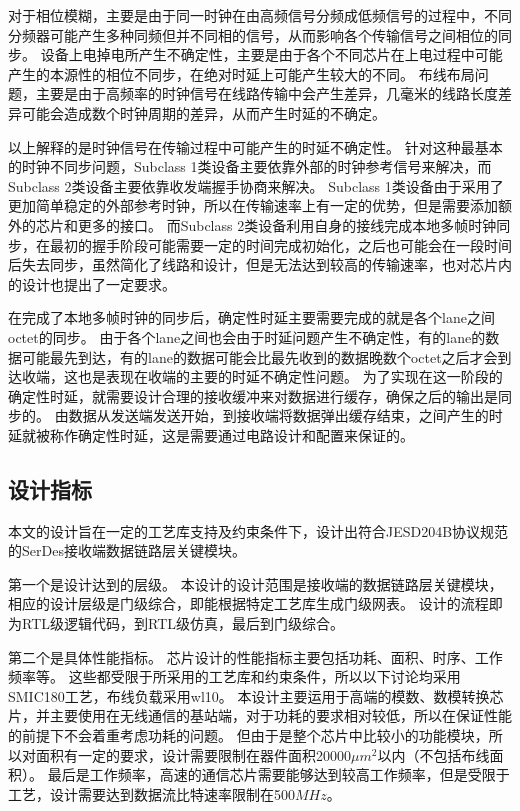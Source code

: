 \documentclass[UTF8]{ctexart}
\begin{document}
对于相位模糊，主要是由于同一时钟在由高频信号分频成低频信号的过程中，不同分频器可能产生多种同频但并不同相的信号，从而影响各个传输信号之间相位的同步。
设备上电掉电所产生不确定性，主要是由于各个不同芯片在上电过程中可能产生的本源性的相位不同步，在绝对时延上可能产生较大的不同。
布线布局问题，主要是由于高频率的时钟信号在线路传输中会产生差异，几毫米的线路长度差异可能会造成数个时钟周期的差异，从而产生时延的不确定。

以上解释的是时钟信号在传输过程中可能产生的时延不确定性。
针对这种最基本的时钟不同步问题，Subclass 1类设备主要依靠外部的时钟参考信号来解决，而Subclass 2类设备主要依靠收发端握手协商来解决。
Subclass 1类设备由于采用了更加简单稳定的外部参考时钟，所以在传输速率上有一定的优势，但是需要添加额外的芯片和更多的接口。
而Subclass 2类设备利用自身的接线完成本地多帧时钟同步，在最初的握手阶段可能需要一定的时间完成初始化，之后也可能会在一段时间后失去同步，虽然简化了线路和设计，但是无法达到较高的传输速率，也对芯片内的设计也提出了一定要求。

在完成了本地多帧时钟的同步后，确定性时延主要需要完成的就是各个lane之间octet的同步。
由于各个lane之间也会由于时延问题产生不确定性，有的lane的数据可能最先到达，有的lane的数据可能会比最先收到的数据晚数个octet之后才会到达收端，这也是表现在收端的主要的时延不确定性问题。
为了实现在这一阶段的确定性时延，就需要设计合理的接收缓冲来对数据进行缓存，确保之后的输出是同步的。
由数据从发送端发送开始，到接收端将数据弹出缓存结束，之间产生的时延就被称作确定性时延，这是需要通过电路设计和配置来保证的。

\subsection{设计指标}

本文的设计旨在一定的工艺库支持及约束条件下，设计出符合JESD204B协议规范的SerDes接收端数据链路层关键模块。

第一个是设计达到的层级。
本设计的设计范围是接收端的数据链路层关键模块，相应的设计层级是门级综合，即能根据特定工艺库生成门级网表。
设计的流程即为RTL级逻辑代码，到RTL级仿真，最后到门级综合。

第二个是具体性能指标。
芯片设计的性能指标主要包括功耗、面积、时序、工作频率等。
这些都受限于所采用的工艺库和约束条件，所以以下讨论均采用SMIC180工艺，布线负载采用wl10。
本设计主要运用于高端的模数、数模转换芯片，并主要使用在无线通信的基站端，对于功耗的要求相对较低，所以在保证性能的前提下不会着重考虑功耗的问题。
但由于是整个芯片中比较小的功能模块，所以对面积有一定的要求，设计需要限制在器件面积20000$\mu m^2$以内（不包括布线面积）。
最后是工作频率，高速的通信芯片需要能够达到较高工作频率，但是受限于工艺，设计需要达到数据流比特速率限制在500$MHz$。


\end{document}
